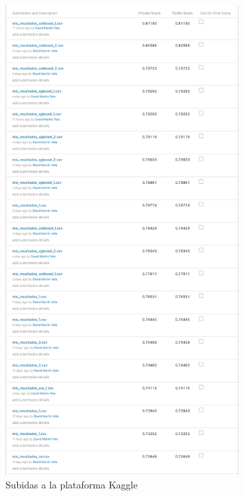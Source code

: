 \documentclass[12pt,twoside]{report}
\begin{document}
\begin{figure}[H]
\begin{center}
\includegraphics[width=9cm]{../notebooks/figures/subidas.png}
\caption{Subidas a la plataforma Kaggle}
\label{fig:subidas}
\end{center}
\end{figure} 
\end{document}
